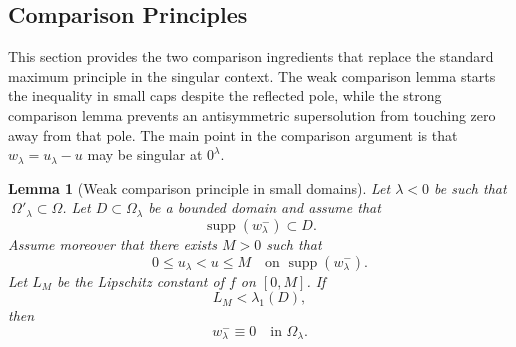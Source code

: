 \documentclass[11pt,a4paper]{article}
\newtheorem{lemma}[theorem]{Lemma}
\newcommand{\supp}{\operatorname{supp}}
\begin{document}
\subsection{Comparison Principles}

This section provides the two comparison ingredients that replace the standard maximum principle in the singular context. The weak comparison lemma starts the inequality in small caps despite the reflected pole, while the strong comparison lemma prevents an antisymmetric supersolution from touching zero away from that pole.
The main point in the comparison argument is that \(w_\lambda=u_\lambda-u\) may be singular at \(0^\lambda\). 

\begin{lemma}[Weak comparison principle in small domains]\label{weak comparison principle in small domains}
Let \(\lambda<0\) be such that \(\ \Omega'_{\lambda} \subset \Omega\). Let \(D\subset\Omega_\lambda\) be a bounded domain and assume that
\[
\supp(w_\lambda^-)\subset D.
\]
Assume moreover that there exists \(M>0\) such that
\[
0\le u_\lambda<u\le M
\quad\text{on }\supp(w_\lambda^-).
\]
Let \(L_M\) be the Lipschitz constant of \(f\) on \([0,M]\). If
\[
L_M<\lambda_1(D),
\]
then
\[
w_\lambda^-\equiv0
\quad\text{in }\Omega_\lambda.
\]
\end{lemma}
\end{document}
